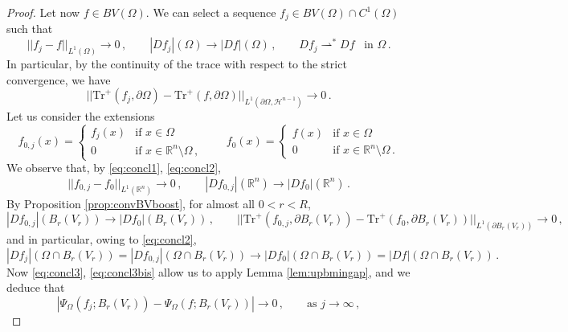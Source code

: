 \documentclass[a4paper,reqno,11pt]{amsart}
\newcommand{\R}{\mathbb{R}}
\newcommand{\weakto}{\rightharpoonup}
\newcommand{\ra}{\rightarrow}
\newcommand{\Hau}{{\mathcal H}} %
\newcommand{\de}{\partial}
\newcommand{\Tr}{{\mathrm{Tr}}}
\begin{document}
\begin{proof}
		Let now $f \in BV(\Omega)$. We can select a sequence $f_j \in BV(\Omega) \cap C^1(\Omega)$ such that
		\begin{equation} \label{eq:concl1}
			||f_j - f||_{L^1(\Omega)} \to 0 \, , \qquad |Df_j|(\Omega) \to |Df|(\Omega) \, , \qquad Df_j \mathop\weakto^\ast Df \, \, \, \, \, \text{in $\Omega \, .$}
		\end{equation}
		In particular, by the continuity of the trace with respect to the strict convergence, we have
		\begin{equation} \label{eq:concl2}
			||\Tr^{+}(f_j,\de \Omega) - \Tr^{+}(f,\de \Omega)||_{L^1(\de \Omega, \Hau^{n-1})} \to 0 \, .
		\end{equation}
		Let us consider the extensions
		\begin{equation*}
			f_{0,j}(x) = 
			\begin{cases}
				f_j(x) & \text{if $x \in \Omega$} \\
				0 & \text{if $x \in \R^n \setminus \Omega \, ,$}
			\end{cases}
			\qquad
			f_{0}(x) = 
			\begin{cases}
				f(x) & \text{if $x \in \Omega$} \\
				0 & \text{if $x \in \R^n \setminus \Omega \, .$}
			\end{cases}
		\end{equation*}
		We observe that, by \eqref{eq:concl1}, \eqref{eq:concl2},
		\begin{equation*}
			||f_{0,j} - f_{0}||_{L^1(\R^n)} \to 0 \, , \qquad |D f_{0,j}|(\R^n) \to |Df_{0}|(\R^n) \, .
		\end{equation*}
		By Proposition \ref{prop:convBVboost}, for almost all $0 < r < R$,
		\begin{equation} \label{eq:concl3}
			|D f_{0,j}|(B_r(V_r)) \to |D f_{0}|(B_r(V_r)) \, , \qquad ||\Tr^{+}(f_{0,j},\de B_r(V_r)) - \Tr^{+}(f_{0},\de B_r(V_r))||_{L^1(\de B_r(V_r))}\to 0 \, ,
		\end{equation}
		and in particular, owing to \eqref{eq:concl2},
		\begin{equation} \label{eq:concl3bis}
			|D f_j|(\Omega \cap B_r(V_r)) = |D f_{0,j}|(\Omega \cap B_r(V_r)) \to |Df_{0}|(\Omega \cap B_r(V_r)) = |Df|(\Omega \cap B_r(V_r)) \, .
		\end{equation}
		Now \eqref{eq:concl3}, \eqref{eq:concl3bis} allow us to apply Lemma \ref{lem:upbmingap}, and we deduce that
		\begin{equation*}
			|\Psi_\Omega(f_j;B_r(V_r)) - \Psi_\Omega(f;B_r(V_r))| \to 0 \, , \qquad \text{as $j \ra \infty \, ,$}

\end{equation*}
\end{proof}
\end{document}
